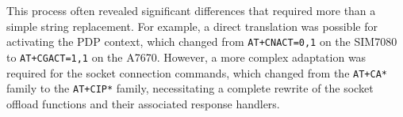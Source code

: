 This process often revealed significant differences that required more than a simple string replacement. For example, a direct translation was possible for activating the PDP context, which changed from \texttt{AT+CNACT=0,1} on the SIM7080 to \texttt{AT+CGACT=1,1} on the A7670. However, a more complex adaptation was required for the socket connection commands, which changed from the \texttt{AT+CA*} family to the \texttt{AT+CIP*} family, necessitating a complete rewrite of the socket offload functions and their associated response handlers.
